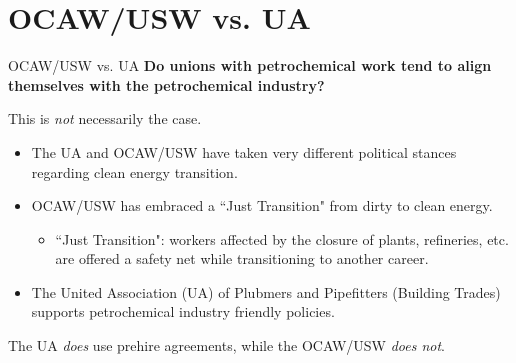 \documentclass{beamer}
\begin{document}

\section{OCAW/USW vs. UA}
\begin{frame}{OCAW/USW vs. UA}
\textbf{Do unions with petrochemical work tend to align themselves with the petrochemical industry?}\newline

This is \emph{not} necessarily the case.
	\begin{itemize}
		\item The UA and OCAW/USW have taken very different political stances regarding clean energy transition.
		\item OCAW/USW has embraced a ``Just Transition" from dirty to clean energy.
	\begin{itemize}
		\item ``Just Transition": workers affected by the closure of plants, refineries, etc. are offered a safety net while transitioning to another career.
	\end{itemize}
	\item The United Association (UA) of Plubmers and Pipefitters (Building Trades) supports petrochemical industry friendly policies.
	\end{itemize}
The UA \emph{does} use prehire agreements, while the OCAW/USW \emph{does not}.
\end{frame}
\end{document}
